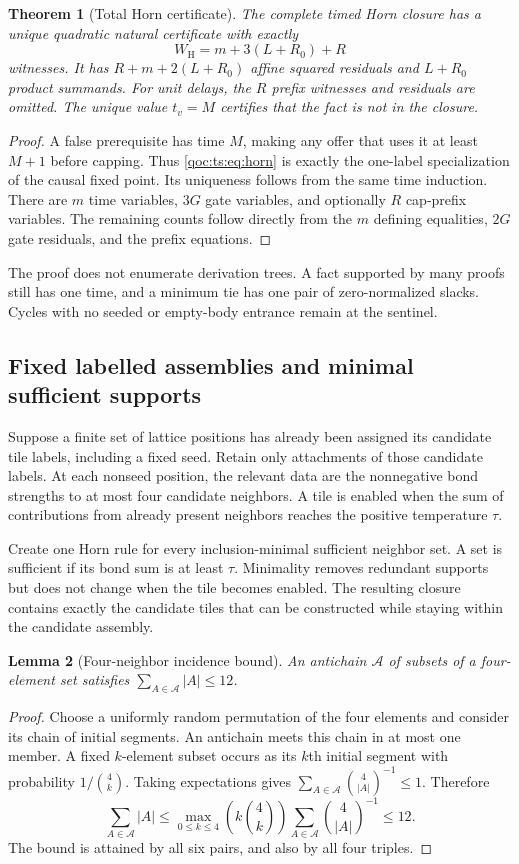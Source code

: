 \documentclass[11pt,letterpaper]{article}
\newtheorem{theorem}{Theorem}[section]
\newtheorem{lemma}[theorem]{Lemma}
\theoremstyle{definition}
\theoremstyle{remark}
\begin{document}
\begin{theorem}[Total Horn certificate]\label{qoc:ts:thm:horn}
The complete timed Horn closure has a unique quadratic natural certificate
with exactly
\[
 W_{\mathrm H}=m+3(L+R_0)+R
\]
witnesses. It has $R+m+2(L+R_0)$ affine squared residuals and $L+R_0$
product summands. For unit delays, the $R$ prefix witnesses and residuals
are omitted. The unique value $t_v=M$ certifies that the fact is not in
the closure.
\end{theorem}
\begin{proof}
A false prerequisite has time $M$, making any offer that uses it at least
$M+1$ before capping. Thus \eqref{qoc:ts:eq:horn} is exactly the one-label
specialization of the causal fixed point. Its uniqueness follows from the
same time induction. There are $m$ time variables, $3G$ gate variables,
and optionally $R$ cap-prefix variables. The remaining counts follow
directly from the $m$ defining equalities, $2G$ gate residuals, and the
prefix equations.
\end{proof}

The proof does not enumerate derivation trees. A fact supported by many
proofs still has one time, and a minimum tie has one pair of zero-normalized
slacks. Cycles with no seeded or empty-body entrance remain at the sentinel.

\subsection{Fixed labelled assemblies and minimal sufficient supports}
Suppose a finite set of lattice positions has already been assigned its
candidate tile labels, including a fixed seed. Retain only attachments of
those candidate labels. At each nonseed position, the relevant data are
the nonnegative bond strengths to at most four candidate neighbors. A tile
is enabled when the sum of contributions from already present neighbors
reaches the positive temperature $\tau$.

Create one Horn rule for every inclusion-minimal sufficient neighbor set.
A set is sufficient if its bond sum is at least $\tau$. Minimality removes
redundant supports but does not change when the tile becomes enabled.
The resulting closure contains exactly the candidate tiles that can be
constructed while staying within the candidate assembly.

\begin{lemma}[Four-neighbor incidence bound]\label{qoc:ts:lem:antichain}
An antichain $\mathcal A$ of subsets of a four-element set satisfies
$\sum_{A\in\mathcal A}|A|\le12$.
\end{lemma}
\begin{proof}
Choose a uniformly random permutation of the four elements and consider
its chain of initial segments. An antichain meets this chain in at most
one member. A fixed $k$-element subset occurs as its $k$th initial segment
with probability $1/\binom4k$. Taking expectations gives
$\sum_{A\in\mathcal A}\binom4{|A|}^{-1}\le1$. Therefore
\[
 \sum_{A\in\mathcal A}|A|
 \le\max_{0\le k\le4}\left(k\binom4k\right)
 \sum_{A\in\mathcal A}\binom4{|A|}^{-1}\le12.
\]
The bound is attained by all six pairs, and also by all four triples.
\end{proof}
\end{document}
